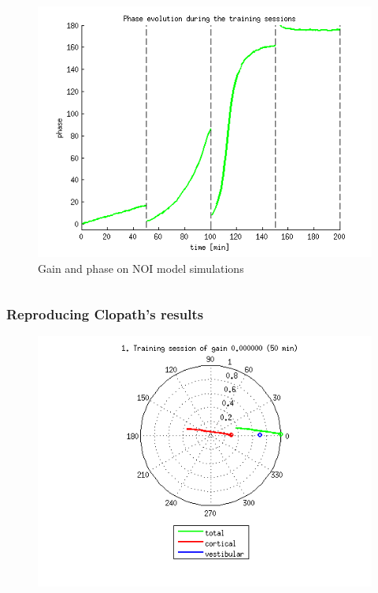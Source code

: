 \documentclass[10pt, compress]{beamer}
\begin{document}
\begin{frame}[fragile]
\begin{columns}[onlytextwidth]
\begin{figure}
      \newline
      \includegraphics[scale=0.25]{images/longnoi_13.png}
      \caption{Gain and phase on NOI model simulations}
    \end{figure}
  \end{columns}
\end{frame}

\begin{frame}[fragile]
  \frametitle{Reproducing Clopath's results}
  \begin{figure}
    \includegraphics[scale=0.5]{images/longnoi_19.png}
  \end{figure}
\end{frame}
\end{document}
